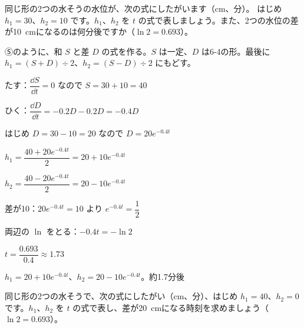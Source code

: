 \begin{reidai}[和と差で解く]
同じ形の2つの水そうの水位が、次の式にしたがいます（cm、分）。
はじめ $h_1=30$、$h_2=10$ です。$h_1$、$h_2$ を $t$ の式で表しましょう。また、2つの水位の差が\qty{10}{cm}になるのは何分後ですか（$\ln2=0.693$）。\par
\kangaekata ⑤のように、和 $S$ と差 $D$ の式を作る。$S$ は一定、$D$ は6-4の形。最後に $h_1=(S+D)\div2$、$h_2=(S-D)\div2$ にもどす。\par
\shiki\kvios{}\zw{} たす：$\dfrac{\dd S}{\dd t}=0$ なので $S=30+10=40$\par
\kvioa ひく：$\dfrac{\dd D}{\dd t}=-0.2D-0.2D=-0.4D$\par
\kviob はじめ $D=30-10=20$ なので $D=20e^{-0.4t}$\par
\kvioa $h_1=\dfrac{40+20e^{-0.4t}}{2}=20+10e^{-0.4t}$\par
\kvioa $h_2=\dfrac{40-20e^{-0.4t}}{2}=20-10e^{-0.4t}$\par
\kvioa 差が10：$20e^{-0.4t}=10$ より $e^{-0.4t}=\dfrac12$\par
\kviob 両辺の $\ln$ をとる：$-0.4t=-\ln2$\par
\kviob $t=\dfrac{0.693}{0.4}\approx1.73$\par
\kotae\kvios{}\zw{} $h_1=20+10e^{-0.4t}$、$h_2=20-10e^{-0.4t}$。約1.7分後
\end{reidai}

\begin{jibun}
同じ形の2つの水そうで、次の式にしたがい（cm、分）、はじめ $h_1=40$、$h_2=0$ です。$h_1$、$h_2$ を $t$ の式で表し、差が\qty{20}{cm}になる時刻を求めましょう（$\ln2=0.693$）。
\end{jibun}


